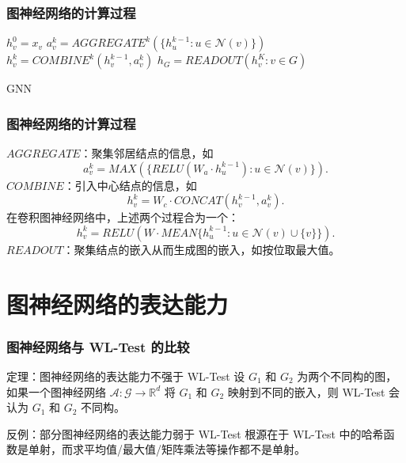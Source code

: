 \documentclass{beamer}
\begin{document}
\begin{frame}

  \frametitle{图神经网络的计算过程}
    \begin{algorithm}[H]
    \begin{algorithmic}[1]
        \STATE $h_v^0 = x_v$
      \ENDFOR
        \STATE $a_v^k = AGGREGATE^k(\{h_u^{k-1} : u \in \mathcal{N}(v)\})$
        \STATE $h_v^k = COMBINE^k(h_v^{k-1}, a_v^k)$
      \ENDFOR
      \STATE $h_G = READOUT({h_v^K : v \in G})$
    \end{algorithmic}
    \caption{GNN}
    \label{alg:gnn}
    \end{algorithm}
      
\end{frame}

\begin{frame}

  \frametitle{图神经网络的计算过程}
      
  $AGGREGATE$：聚集邻居结点的信息，如 
  $$a_v^k = MAX(\{RELU(W_a \cdot h_u^{k-1}) : u \in \mathcal{N}(v)\}).$$
  $COMBINE$：引入中心结点的信息，如
  $$h_v^k = W_c \cdot CONCAT(h_v^{k-1}, a_v^k).$$
  在卷积图神经网络中，上述两个过程合为一个：
  $$h_v^k = RELU(W \cdot MEAN \{h_u^{k-1} : u \in \mathcal{N}(v) \cup \{v\} \}).$$
  $READOUT$：聚集结点的嵌入从而生成图的嵌入，如按位取最大值。
\end{frame}

\section{图神经网络的表达能力}

\begin{frame}

  \frametitle{图神经网络与 WL-Test 的比较}
  \begin{block}{定理：图神经网络的表达能力不强于 WL-Test}
    设 $G_1$ 和 $G_2$ 为两个不同构的图，如果一个图神经网络 $\mathcal{A}: \mathcal{G} \rightarrow \mathbb{R}^d$
    将 $G_1$ 和 $G_2$ 映射到不同的嵌入，则 WL-Test 会认为 $G_1$ 和 $G_2$ 不同构。
  \end{block}
  \begin{alertblock}{反例：部分图神经网络的表达能力弱于 WL-Test}
    根源在于 WL-Test 中的哈希函数是单射，而求平均值/最大值/矩阵乘法等操作都不是单射。
  \end{alertblock}

\end{frame}
\end{document}
